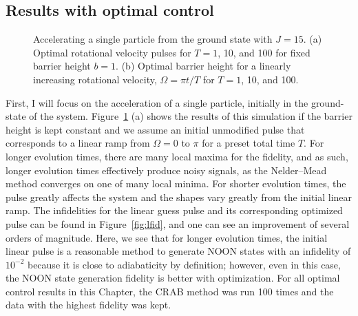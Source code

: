 \subsection{Results with optimal control}

\begin{figure}
 \centering
 \caption{Accelerating a single particle from the ground state with $J=15$.
 (a) Optimal rotational velocity pulses for $T = 1$, 10, and 100 for fixed barrier height $b=1$.
 (b) Optimal barrier height for a linearly increasing rotational velocity, $\Omega = \pi t/T$ for $T=1$, 10, and 100.}
 \label{fig:pulses}
\end{figure}

First, I will focus on the acceleration of a single particle, initially in the ground-state of the system.
Figure~\ref{fig:pulses} (a) shows the results of this simulation if the barrier height is kept constant and we assume an initial unmodified pulse that corresponds to a linear ramp from $\Omega = 0$ to $\pi$ for a preset total time $T$.
For longer evolution times, there are many local maxima for the fidelity, and 
as such, longer evolution times effectively produce noisy signals, as the Nelder--Mead method converges on one of many local minima.
For shorter evolution times, the pulse greatly affects the system and the shapes vary greatly from the initial linear ramp.
The infidelities for the linear guess pulse and its corresponding optimized pulse can be found in Figure~\ref{fig:lfid}, and one can see an improvement of several orders of magnitude.
Here, we see that for longer evolution times, the initial linear pulse is a reasonable method to generate NOON states with an infidelity of $10^{-2}$ because it is close to adiabaticity by definition; however, even in this case, the NOON state generation fidelity is better with optimization.
For all optimal control results in this Chapter, the CRAB method was run 100 times and the data with the highest fidelity was kept.

